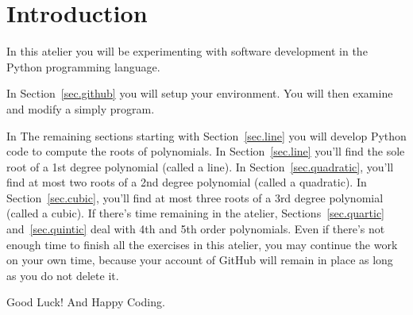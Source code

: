 \section{Introduction}
\label{sec.intro}

In this atelier you will be experimenting with software development
in the Python programming language.

In Section~\ref{sec.github} you will setup your environment. You will then examine and modify
a simply  program.

In The remaining sections starting with Section~\ref{sec.line} you
will develop Python code to compute the roots of polynomials.  In
Section~\ref{sec.line} you'll find the sole root of a 1st degree
polynomial (called a line).  In Section~\ref{sec.quadratic}, you'll
find at most two roots of a 2nd degree polynomial (called a
quadratic). In Section~\ref{sec.cubic}, you'll find at most three
roots of a 3rd degree polynomial (called a cubic).  If there's time
remaining in the atelier, Sections~\ref{sec.quartic}
and~\ref{sec.quintic} deal with 4th and 5th order polynomials.  Even
if there's not enough time to finish all the exercises in this
atelier, you may continue the work on your own time, because your
account of GitHub will remain in place as long as you do not
delete it.

Good Luck! And Happy Coding.


